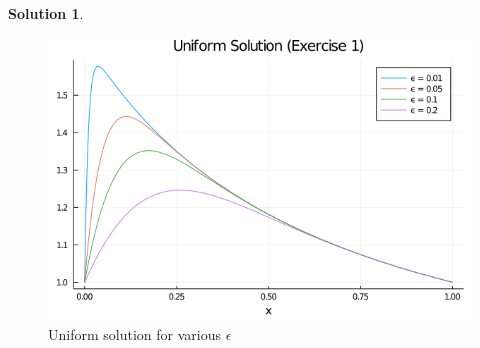 \documentclass[12pt]{article}
\theoremstyle{definition}
\newtheorem{sol}{Solution}
\theoremstyle{remark}
\begin{document}
\begin{sol}
\newpage

\begin{figure}[ht]
    \centering
    \includegraphics[width=0.8\linewidth]{figs/hw-6-exer-1.png}
    \caption{Uniform solution for various $\epsilon$}%
    \label{fig:figs/hw-6-exer-1}
\end{figure}
\end{sol}
\end{document}
